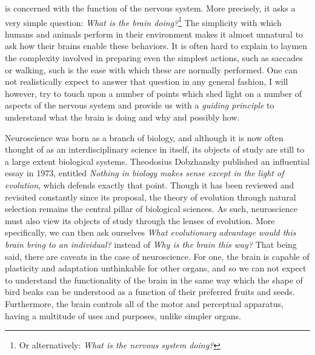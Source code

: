  is concerned with the function of the nervous system. More precisely, it asks a very simple question: {\em What is the brain doing?}\footnote{ Or alternatively: {\em What is the nervous system doing?}} The simplicity with which humans and animals perform in their environment makes it almost unnatural to ask how their brains enable these behaviors. It is often hard to explain to laymen the complexity involved in preparing even the simplest actions, such as saccades or walking, such is the ease with which these are normally performed. One can not realistically expect to answer that question in any general fashion, I will however, try to touch upon a number of points which shed light on a number of aspects of the nervous system and provide us with a {\em guiding principle} to understand what the brain is doing and why and possibly how.\par
Neuroscience was born as a branch of biology, and although it is now often thought of as  an interdisciplinary science in itself, its objects of study are still to a large extent biological systems. Theodosius Dobzhansky published an influential essay in 1973, entitled {\em Nothing in biology makes sense except in the light of evolution}\cite{Dobzhansky1973}, which defends exactly that point. Though it has been reviewed and revisited constantly since its proposal, the theory of evolution through natural selection remains the central pillar of biological sciences. As such, neuroscience must also view its objects of study through the lenses of evolution. More specifically, we can then ask ourselves {\em What evolutionary advantage would this brain bring to an individual?} instead of {\em Why is the brain this way?} That being said,  there are caveats in the case of neuroscience. For one, the brain is capable of plasticity and adaptation unthinkable for other organs, and so we can not expect to understand the functionality of the brain in the same way which the shape of bird beaks can be understood as a function of their preferred fruits and seeds. Furthermore, the brain controls all of the motor and perceptual apparatus, having a multitude of uses and purposes, unlike simpler organs.\par
